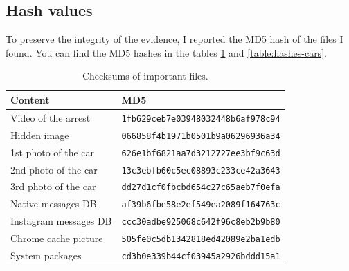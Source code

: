 \documentclass[12pt]{article}
\begin{document}
\subsection{Hash values}

To preserve the integrity of the evidence, I reported the MD5 hash of the files I found. You can find the MD5 hashes in the tables \ref{table:hashes} and \ref{table:hashes-cars}.

\begin{table}[!ht]
    \centering
    \begin{tabular}{ll}
    \toprule
    \textbf{Content} & \textbf{MD5} \\
    \midrule
    Video of the arrest & \texttt{1fb629ceb7e03948032448b6af978c94} \\
    Hidden image & \texttt{066858f4b1971b0501b9a06296936a34} \\
    1st photo of the car & \texttt{626e1bf6821aa7d3212727ee3bf9c63d} \\
    2nd photo of the car & \texttt{13c3ebfb60c5ec08893c233ce42a3643} \\
    3rd photo of the car & \texttt{dd27d1cf0fbcbd654c27c65aeb7f0efa} \\
    Native messages DB & \texttt{af39b6fbe58e2ef549ea2089f164763c} \\
    Instagram messages DB & \texttt{ccc30adbe925068c642f96c8eb2b9b80} \\
    Chrome cache picture & \texttt{505fe0c5db1342818ed42089e2ba1edb} \\
    System packages & \texttt{cd3b0e339b44cf03945a2926bddd15a1} \\
    \bottomrule
    \end{tabular}
    \caption{Checksums of important files.}
    \label{table:hashes}
\end{table}
\end{document}
